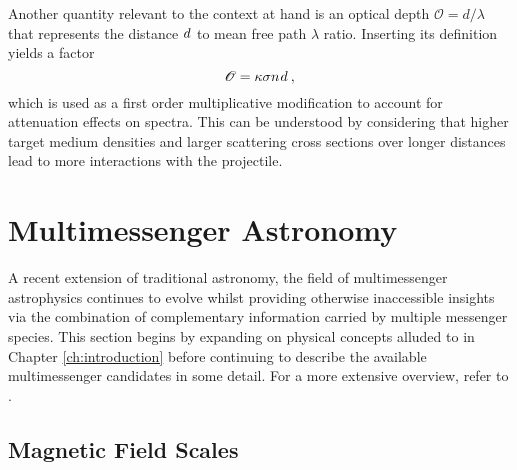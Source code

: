 \begin{spacing}{0.985}
	Another quantity relevant to the context at hand is an optical depth $\mathscr{O} = d / \lambda$ that represents the distance
	$d \kern+0.5pt$ to mean free path $\lambda$ ratio. Inserting its definition yields a factor
	\begin{equation}
		\mathscr{O} = \kappa\sigma n \kern+0.75pt d \: ,
		\label{eqn:optical}
	\end{equation}
	which is used as a first order multiplicative modification to account for attenuation effects on spectra. This can be understood by
	considering that higher target medium densities and larger scattering cross sections over longer distances lead to more interactions
	with the projectile. 
	
	
	
	\section{Multimessenger Astronomy}
	\label{sec:multimessenger}
	
	A recent extension of traditional astronomy, the field of multimessenger astrophysics continues to evolve whilst providing otherwise
	inaccessible insights via the combination of complementary information carried by multiple messenger species. This section begins by
	expanding on physical concepts alluded to in Chapter \ref{ch:introduction} before continuing to describe the available multimessenger
	candidates in some detail. For a more extensive overview, refer to \cite{Meszaros_2019}.
	
	
	
	\subsection{Magnetic Field Scales}
	\label{sub:fields}
	

\end{spacing}
